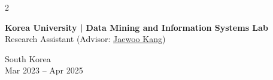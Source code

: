 \documentclass[11pt, letterpaper]{article}
\newenvironment{highlights}{
    \begin{itemize}[
        topsep=0.10 cm,
        parsep=0.10 cm,
        partopsep=0pt,
        itemsep=0pt,
        leftmargin=0 cm + 10pt
    ]
}{
    \end{itemize}
} %
\newenvironment{twocolentry}[2][]{
    \onecolentry
    \def\secondColumn{#2}
    \setcolumnwidth{\fill, 4.8 cm}
    \begin{paracol}{2}
}{
    \switchcolumn \raggedleft \secondColumn
    \end{paracol}
    \endonecolentry
} %
\begin{document}
\vspace{0.3 cm}      
\begin{twocolentry}{
    South Korea\\
    Mar 2023 -- Apr 2025
}
\textbf{Korea University | Data Mining and Information Systems Lab} \href{https://dmis.korea.ac.kr/home}{\faExternalLink*}\\
Research Assistant (Advisor: \href{https://scholar.google.com/citations?user=RaBZafQAAAAJ&hl=en}{Jaewoo Kang})
\end{twocolentry}
\end{document}

